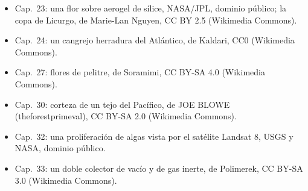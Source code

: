 \begin{itemize}
        público (Wikimedia Commons).
  \item Cap.~23: una flor sobre aerogel de sílice, NASA/JPL, dominio público; la
        copa de Licurgo, de Marie-Lan Nguyen, CC BY 2.5 (Wikimedia Commons).
  \item Cap.~24: un cangrejo herradura del Atlántico, de Kaldari, CC0 (Wikimedia
        Commons).
  \item Cap.~27: flores de pelitre, de Soramimi, CC BY-SA 4.0 (Wikimedia
        Commons).
  \item Cap.~30: corteza de un tejo del Pacífico, de JOE BLOWE (theforestprimeval),
        CC BY-SA 2.0 (Wikimedia Commons).
  \item Cap.~32: una proliferación de algas vista por el satélite Landsat 8, USGS y NASA,
        dominio público.
  \item Cap.~33: un doble colector de vacío y de gas inerte, de Polimerek, CC BY-SA
        3.0 (Wikimedia Commons).
\end{itemize}
\clearpage
